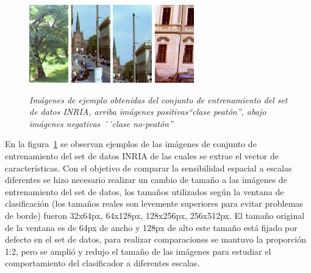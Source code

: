 \begin{figure}[hp]
  \includegraphics[scale=.9]{images/neg2}
  \includegraphics[scale=.9]{images/neg3}
  \includegraphics[scale=.9]{images/neg4}
  \includegraphics[scale=.9]{images/neg5}
  \caption{\em Imágenes de ejemplo obtenidas del conjunto de entrenamiento del set de datos INRIA, arriba imágenes positivas``clase peatón'', abajo imágenes negativas ´´clase no-peatón'' }  
  \label{fig:trainimgs}
\end{figure}

En la figura~\ref{fig:trainimgs} se observan ejemplos de las imágenes de conjunto de entrenamiento del set de datos INRIA de las cuales se extrae el vector de características. Con el objetivo de comparar la sensibilidad espacial a escalas diferentes se hizo necesario realizar un cambio de tamaño a las imágenes de entrenamiento del set de datos, los tamaños utilizados según la ventana de clasificación (los tamaños reales son levemente superiores para evitar problemas de borde) fueron 32x64px, 64x128px, 128x256px, 256x512px. El tamaño original de la ventana es de 64px de ancho y 128px de alto este tamaño está fijado por defecto en el set de datos, para realizar comparaciones se mantuvo la proporción 1:2, pero se amplió y redujo el tamaño de las imágenes para estudiar el comportamiento del clasificador a diferentes escalas.


